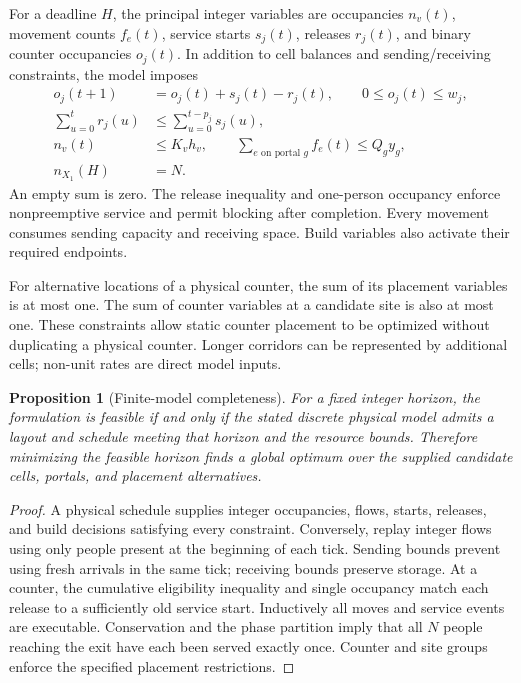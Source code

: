 \documentclass[11pt]{article}
\newtheorem{proposition}[theorem]{Proposition}
\begin{document}
For a deadline $H$, the principal integer variables are occupancies $n_v(t)$, movement counts $f_e(t)$, service starts $s_j(t)$, releases $r_j(t)$, and binary counter occupancies $o_j(t)$. In addition to cell balances and sending/receiving constraints, the model imposes
\begin{align}
 o_j(t+1)&=o_j(t)+s_j(t)-r_j(t),\qquad 0\le o_j(t)\le w_j,\\
 \sum_{u=0}^{t}r_j(u)&\le\sum_{u=0}^{t-p_j}s_j(u),\\
 n_v(t)&\le K_vh_v,\qquad \sum_{e\text{ on portal }g} f_e(t)\le Q_g y_g,\\
 n_{X_1}(H)&=N.
\end{align}
An empty sum is zero. The release inequality and one-person occupancy enforce nonpreemptive service and permit blocking after completion. Every movement consumes sending capacity and receiving space. Build variables also activate their required endpoints.

For alternative locations of a physical counter, the sum of its placement variables is at most one. The sum of counter variables at a candidate site is also at most one. These constraints allow static counter placement to be optimized without duplicating a physical counter. Longer corridors can be represented by additional cells; non-unit rates are direct model inputs.

\begin{proposition}[Finite-model completeness]
For a fixed integer horizon, the formulation is feasible if and only if the stated discrete physical model admits a layout and schedule meeting that horizon and the resource bounds. Therefore minimizing the feasible horizon finds a global optimum over the supplied candidate cells, portals, and placement alternatives.
\end{proposition}
\begin{proof}
A physical schedule supplies integer occupancies, flows, starts, releases, and build decisions satisfying every constraint. Conversely, replay integer flows using only people present at the beginning of each tick. Sending bounds prevent using fresh arrivals in the same tick; receiving bounds preserve storage. At a counter, the cumulative eligibility inequality and single occupancy match each release to a sufficiently old service start. Inductively all moves and service events are executable. Conservation and the phase partition imply that all $N$ people reaching the exit have each been served exactly once. Counter and site groups enforce the specified placement restrictions.
\end{proof}
\end{document}
